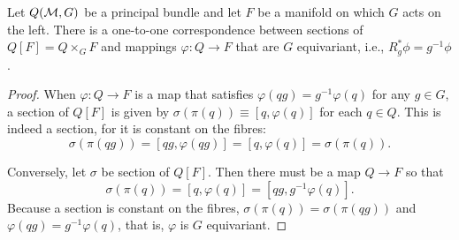 \documentclass[
final,
11pt,
a4paper,
DIV=11,
headinclude=true,
footinclude=false,
bibliography=totoc,
twoside=true,  %
BCOR=5mm
]{scrbook}
\begin{document}
\begin{proposition}
\label{prop:corr_sec_map}
Let $Q(\mathcal{M},G)$ be a principal bundle and let $F$ be a manifold 
on which $G$ acts on the left. There is a one-to-one 
correspondence between sections of $Q[F] = Q \times_G F$ and 
mappings $\varphi : Q \to F$ that are $G$ equivariant, i.e., 
$R_g^*\phi = g^{-1}\phi$.
\end{proposition}
\begin{proof}
When $\varphi : Q \to F$ is a map that satisfies $\varphi(qg) = 
g^{-1} \varphi(q)$ for any $g \in G$, a section of $Q[F]$ is 
given by $\sigma(\pi(q)) \equiv [q,\varphi(q)]$ for each $q \in 
Q$. This is indeed a section, for it is constant on the fibres:
\begin{equation*}
  \sigma(\pi(qg)) = [qg,\varphi(qg)] = [q,\varphi(q)] = 
  \sigma(\pi(q)).
\end{equation*}

Conversely, let $\sigma$ be section of $Q[F]$. Then there must be 
a map $Q \to F$ so that
\begin{equation*}
  \sigma(\pi(q)) = [q,\varphi(q)] = [qg,g^{-1}\varphi(q)].
\end{equation*}
Because a section is constant on the fibres, $\sigma(\pi(q)) = 
\sigma(\pi(qg))$ and $\varphi(qg) = g^{-1}\varphi(q)$, that is, 
$\varphi$ is $G$ equivariant.
\end{proof}
\end{document}
